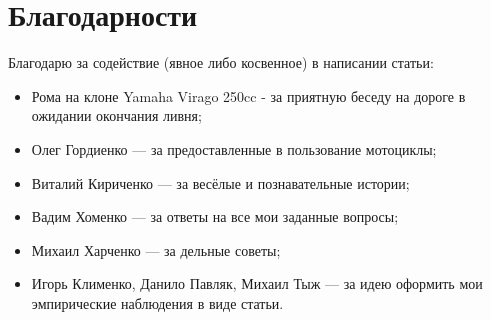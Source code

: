 \documentclass[12pt,a4paper]{article}
\begin{document}
\clearpage

\section{Благодарности}

Благодарю за содействие (явное либо косвенное) в написании статьи:

\begin{itemize}
\item Рома на клоне Yamaha Virago 250cc - за приятную беседу на дороге
в ожидании окончания ливня;
\item Олег Гордиенко --- за предоставленные в пользование мотоциклы;
\item Виталий Кириченко --- за весёлые и познавательные истории;
\item Вадим Хоменко --- за ответы на все мои заданные вопросы;
\item Михаил Харченко --- за дельные советы;
\item Игорь Клименко, Данило Павляк, Михаил Тыж --- за идею оформить
мои эмпирические наблюдения в виде статьи.
\end{itemize}
\end{document}
